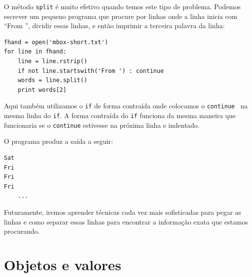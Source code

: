 O método {\tt split} é muito efetivo quando temos este tipo de 
problema.
Podemos escrever um pequeno programa que procure por linhas onde
a linha inicia com ``From '', dividir essas linhas, e então imprimir
a terceira palavra da linha:

\beforeverb
\begin{verbatim}
fhand = open('mbox-short.txt')
for line in fhand:
    line = line.rstrip()
    if not line.startswith('From ') : continue
    words = line.split()
    print words[2]
\end{verbatim}
\afterverb
%

Aqui também utilizamos o {\tt if} de forma contraída
onde colocamos o {\tt continue } na mesma linha
do {\tt if}. A forma contraída do {\tt if} funciona
da mesma maneira que funcionaria se o {\tt continue}
estivesse na próxima linha e indentado.

O programa produz a saída a seguir:

\beforeverb
\begin{verbatim}
Sat
Fri
Fri
Fri
    ...
\end{verbatim}
\afterverb
%

Futuramente, iremos aprender técnicas cada vez mais sofisticadas
para pegar as linhas e como separar essas linhas para encontrar a 
informação exata que estamos procurando.

\section{Objetos e valores}

